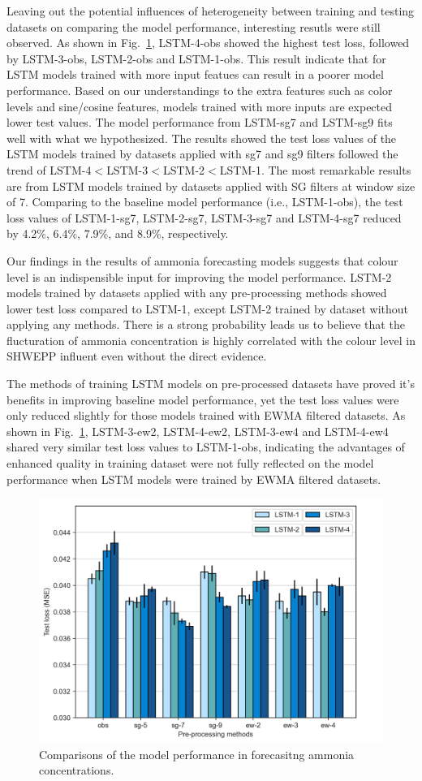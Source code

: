 Leaving out the potential influences of heterogeneity between training and testing datasets on comparing the model performance, interesting resutls were still observed. As shown in Fig.~\ref{fig:nh3-feature-engineering}, LSTM-4-obs showed the highest test loss, followed by LSTM-3-obs, LSTM-2-obs and LSTM-1-obs. This result indicate that for LSTM models trained with more input featues can result in a poorer model performance. Based on our understandings to the extra features such as color levels and sine/cosine features, models trained with more inputs are expected lower test values. The model performance from LSTM-sg7 and LSTM-sg9 fits well with what we hypothesized. The results showed the test loss values of the LSTM models trained by datasets applied with sg7 and sg9 filters followed the trend of LSTM-4$<$LSTM-3$<$LSTM-2$<$LSTM-1. The most remarkable results are from LSTM models trained by datasets applied with SG filters at window size of 7. Comparing to the baseline model performance (i.e., LSTM-1-obs), the test loss values of LSTM-1-sg7, LSTM-2-sg7, LSTM-3-sg7 and LSTM-4-sg7 reduced by 4.2\%, 6.4\%, 7.9\%, and 8.9\%, respectively. 

Our findings in the results of ammonia forecasting models suggests that colour level is an indispensible input for improving the model performance. LSTM-2 models trained by datasets applied with any pre-processing methods showed lower test loss compared to LSTM-1, except LSTM-2 trained by dataset without applying any methods. There is a strong probability leads us to believe that the flucturation of ammonia concentration is highly correlated with the colour level in SHWEPP influent even without the direct evidence.

The methods of training LSTM models on pre-processed datasets have proved it's benefits in improving baseline model performance, yet the test loss values were only reduced slightly for those models trained with EWMA filtered datasets. As shown in Fig.~\ref{fig:nh3-feature-engineering}, LSTM-3-ew2, LSTM-4-ew2, LSTM-3-ew4 and LSTM-4-ew4 shared very similar test loss values to LSTM-1-obs, indicating the advantages of enhanced quality in training dataset were not fully reflected on the model performance when LSTM models were trained by EWMA filtered datasets.

\begin{figure}[h]
    \centering
    \includegraphics[width=0.6\columnwidth]{imgs/results/feature-engineering/nh3-input-1-4-comparison.png}
    \caption{Comparisons of the model performance in forecasitng ammonia concentrations.}
    \label{fig:nh3-feature-engineering}
 \end{figure}

